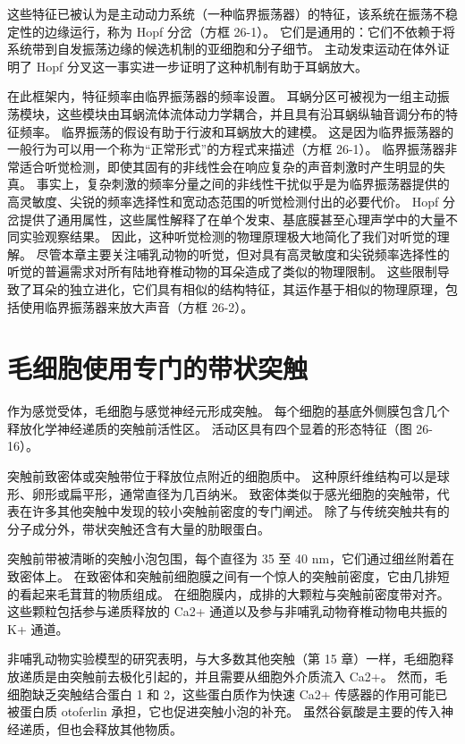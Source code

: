 这些特征已被认为是主动动力系统（一种临界振荡器）的特征，该系统在振荡不稳定性的边缘运行，称为 Hopf 分岔（方框 26-1）。 它们是通用的：它们不依赖于将系统带到自发振荡边缘的候选机制的亚细胞和分子细节。 主动发束运动在体外证明了 Hopf 分叉这一事实进一步证明了这种机制有助于耳蜗放大。

在此框架内，特征频率由临界振荡器的频率设置。 耳蜗分区可被视为一组主动振荡模块，这些模块由耳蜗流体流体动力学耦合，并且具有沿耳蜗纵轴音调分布的特征频率。 临界振荡的假设有助于行波和耳蜗放大的建模。 这是因为临界振荡器的一般行为可以用一个称为“正常形式”的方程式来描述（方框 26-1）。 临界振荡器非常适合听觉检测，即使其固有的非线性会在响应复杂的声音刺激时产生明显的失真。 事实上，复杂刺激的频率分量之间的非线性干扰似乎是为临界振荡器提供的高灵敏度、尖锐的频率选择性和宽动态范围的听觉检测付出的必要代价。 Hopf 分岔提供了通用属性，这些属性解释了在单个发束、基底膜甚至心理声学中的大量不同实验观察结果。 因此，这种听觉检测的物理原理极大地简化了我们对听觉的理解。 尽管本章主要关注哺乳动物的听觉，但对具有高灵敏度和尖锐频率选择性的听觉的普遍需求对所有陆地脊椎动物的耳朵造成了类似的物理限制。 这些限制导致了耳朵的独立进化，它们具有相似的结构特征，其运作基于相似的物理原理，包括使用临界振荡器来放大声音（方框 26-2）。


\section{毛细胞使用专门的带状突触}

作为感觉受体，毛细胞与感觉神经元形成突触。 每个细胞的基底外侧膜包含几个释放化学神经递质的突触前活性区。 活动区具有四个显着的形态特征（图 26-16）。

突触前致密体或突触带位于释放位点附近的细胞质中。 这种原纤维结构可以是球形、卵形或扁平形，通常直径为几百纳米。 致密体类似于感光细胞的突触带，代表在许多其他突触中发现的较小突触前密度的专门阐述。 除了与传统突触共有的分子成分外，带状突触还含有大量的肋眼蛋白。

突触前带被清晰的突触小泡包围，每个直径为 35 至 40 nm，它们通过细丝附着在致密体上。 在致密体和突触前细胞膜之间有一个惊人的突触前密度，它由几排短的看起来毛茸茸的物质组成。 在细胞膜内，成排的大颗粒与突触前密度带对齐。 这些颗粒包括参与递质释放的 Ca2+ 通道以及参与非哺乳动物脊椎动物电共振的 K+ 通道。

非哺乳动物实验模型的研究表明，与大多数其他突触（第 15 章）一样，毛细胞释放递质是由突触前去极化引起的，并且需要从细胞外介质流入 Ca2+。 然而，毛细胞缺乏突触结合蛋白 1 和 2，这些蛋白质作为快速 Ca2+ 传感器的作用可能已被蛋白质 otoferlin 承担，它也促进突触小泡的补充。 虽然谷氨酸是主要的传入神经递质，但也会释放其他物质。

